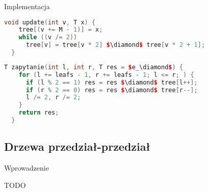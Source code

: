 \documentclass[../main.tex]{subfiles}
\begin{document}
\begin{frame}[fragile]{\subsecname}{Implementacja}

\begin{block}{}
\begin{lstlisting}[language = C++]
  void update(int v, T x) {
    tree[(v += M - 1)] = x;
    while ((v /= 2))
      tree[v] = tree[v * 2] $\diamond$ tree[v * 2 + 1];
  }
\end{lstlisting}
\end{block}

\begin{block}{}
\begin{lstlisting}[language = C++]
  T zapytanie(int l, int r, T res = $e_\diamond$) {
    for (l += leafs - 1, r += leafs - 1; l <= r; ) {
      if (l % 2 == 1) res = res $\diamond$ tree[l++];
      if (r % 2 == 0) res = res $\diamond$ tree[r--];
      l /= 2, r /= 2;
    }
    return res;
  }
\end{lstlisting}
\end{block}

\end{frame}

\subsection{Drzewa przedział-przedział}

\begin{frame}{\subsecname}{Wprowadzenie}

TODO

\end{frame}
\end{document}
